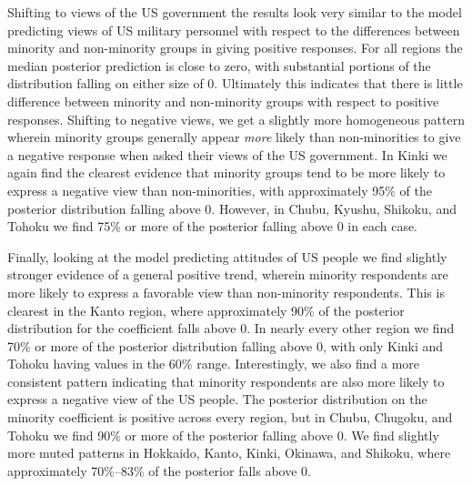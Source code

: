 Shifting to views of the US government the results look very similar to the model predicting views of US military personnel with respect to the differences between minority and non-minority groups in giving positive responses. For all regions the median posterior prediction is close to zero, with substantial portions of the distribution falling on either size of 0. Ultimately this indicates that there is little difference between minority and non-minority groups with respect to positive responses. Shifting to negative views, we get a slightly more homogeneous pattern wherein minority groups generally appear \textit{more} likely than non-minorities to give a negative response when asked their views of the US government. In Kinki we again find the clearest evidence that minority groups tend to be more likely to express a negative view than non-minorities, with approximately 95\% of the posterior distribution falling above 0. However, in Chubu, Kyushu, Shikoku, and Tohoku we find 75\% or more of the posterior falling above 0 in each case.

Finally, looking at the model predicting attitudes of US people we find slightly stronger evidence of a general positive trend, wherein minority respondents are more likely to express a favorable view than non-minority respondents. This is clearest in the Kanto region, where approximately 90\% of the posterior distribution for the coefficient falls above 0. In nearly every other region we find 70\% or more of the posterior distribution falling above 0, with only Kinki and Tohoku having values in the 60\% range. Interestingly, we also find a more consistent pattern indicating that minority respondents are also more likely to express a negative view of the US people. The posterior distribution on the minority coefficient is positive across every region, but in Chubu, Chugoku, and Tohoku we find 90\% or more of the posterior falling above 0. We find slightly more muted patterns in Hokkaido, Kanto, Kinki, Okinawa, and Shikoku, where approximately 70\%--83\% of the posterior falls above 0.

